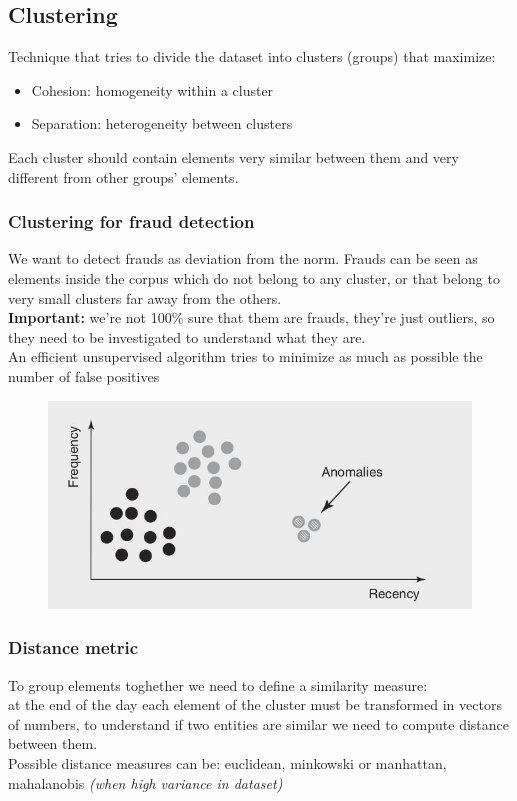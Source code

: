 \subsection{Clustering}
    Technique that tries to divide the dataset into clusters (groups) that maximize:
    \begin{itemize}
        \item Cohesion: homogeneity within a cluster 
        \item Separation: heterogeneity between clusters 
    \end{itemize}
    Each cluster should contain elements very similar between them and very different from other groups' elements.
    \subsubsection{Clustering for fraud detection}
        We want to detect frauds as deviation from the norm. Frauds can be seen as elements inside the corpus which do not belong to any cluster, or that belong to very small clusters far away from the others.\\
        \textbf{Important:} we're not 100\% sure that them are frauds, they're just outliers, so they need to be investigated to understand what they are.\\ 
        An efficient unsupervised algorithm tries to minimize as much as possible the number of false positives
        \begin{figure}[ht!]
            \centering
            \includegraphics[width=0.6\linewidth]{lecture_13/anomalies.png}
        \end{figure}
    \subsubsection{Distance metric}
        To group elements toghether we need to define a similarity measure:\\
        at the end of the day each element of the cluster must be transformed in vectors of numbers, to understand if two entities are similar we need to compute distance between them.\\
        Possible distance measures can be: euclidean, minkowski or manhattan, mahalanobis \textit{(when high variance in dataset)}
